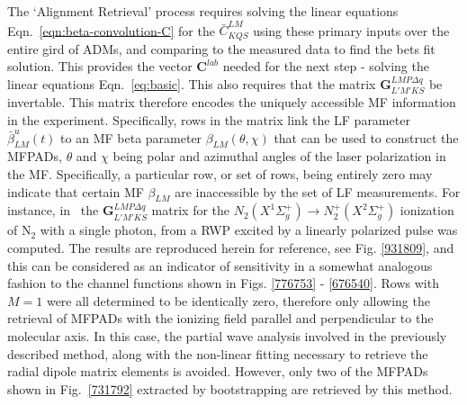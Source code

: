 \documentclass[10pt]{article}
\begin{document}
The `Alignment Retrieval' process requires solving the linear equations Eqn.~\ref{eqn:beta-convolution-C} for the $\bar{C}^{LM}_{KQS}$ using these primary inputs over the entire gird of ADMs, and comparing to the measured data to find the bets fit solution. This provides the vector $\mathbf{C}^{lab}$ needed for the next step - solving the linear equations Eqn.~\ref{eq:basic}. This also requires that the matrix $\mathbf{{G}}^{LMP\Delta q }_{L'M'KS}$ be invertable. This matrix therefore encodes the uniquely accessible MF information in the experiment. Specifically, rows in the matrix link the LF parameter $\bar{\beta}^u_{LM}(t)$  to an MF beta parameter $\beta_{LM}(\theta,\chi)$ that can be used to construct the MFPADs, $\theta$ and $\chi$ being polar and azimuthal angles of the laser polarization in the MF. Specifically, a particular row, or set of rows, being entirely zero may indicate that certain MF $\beta_{LM}$ are inaccessible by the set of LF measurements. For instance, in~\cite{gregory2021MolecularFramePhotoelectron} the $\mathbf{{G}}^{LMP\Delta q }_{L'M'KS}$ matrix for the $N_2(X^{1}\Sigma^{+}_{g}) \rightarrow N^+_2(X^{2}\Sigma^{+}_{g})$ ionization of N$_2$ with a single photon, from a RWP excited by a linearly polarized pulse was computed. The results are reproduced herein for reference, see Fig. \ref{931809}, and this can be considered as an indicator of sensitivity in a somewhat analogous fashion to the channel functions shown in Figs. \ref{776753} - \ref{676540}. Rows with $M = 1$ were all determined to be identically zero, therefore only allowing the retrieval of MFPADs with the ionizing field parallel and perpendicular to the molecular axis. In this case, the partial wave analysis involved in the previously described method, along with the non-linear fitting necessary to retrieve the radial dipole matrix elements is avoided. However, only two of the MFPADs shown in Fig.~\ref{731792} extracted by bootstrapping are retrieved by this method.\\
\end{document}
